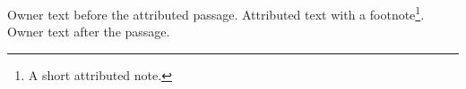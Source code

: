 \documentclass[\SummaryClassOptions]{article}
\providecommand\SummaryCommand{\AuthorshipSummaryFullWidth}
\begin{document}
Owner text before the attributed passage.
Attributed text with a footnote\footnote{A short attributed note.}.
Owner text after the passage.
\SummaryCommand
\end{document}
